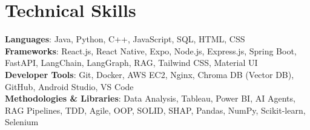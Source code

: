 \documentclass[letterpaper,11pt]{article}
\begin{document}
\section{Technical Skills}
 \begin{itemize}[leftmargin=0.15in, label={}]
    \small{\item{
     \textbf{Languages}{: Java, Python, C++, JavaScript, SQL, HTML, CSS} \\
     \textbf{Frameworks}{: React.js, React Native, Expo, Node.js, Express.js, Spring Boot, FastAPI, LangChain, LangGraph, RAG, Tailwind CSS, Material UI} \\
     \textbf{Developer Tools}{: Git, Docker, AWS EC2, Nginx, Chroma DB (Vector DB), GitHub, Android Studio, VS Code} \\
     \textbf{Methodologies \& Libraries}{: Data Analysis, Tableau, Power BI, AI Agents, RAG Pipelines, TDD, Agile, OOP, SOLID, SHAP, Pandas, NumPy, Scikit-learn, Selenium}
    }}
 \end{itemize}
\end{document}
